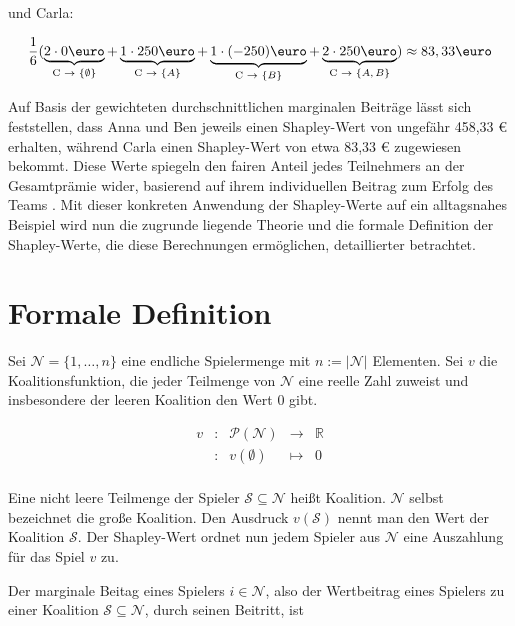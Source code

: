 und Carla:

\begin{equation}
  \frac{1}{6} ( \underbrace{2 \cdot 0 \text{\euro}}_{\text{C $\rightarrow$ $\{\emptyset$\}}} + \underbrace{1 \cdot 250 \text{\euro}}_{\text{C $\rightarrow$ $\{A$\}}} + \underbrace{1 \cdot (-250) \text{\euro}}_{\text{C $\rightarrow$ $\{B$\}}} + \underbrace{2 \cdot 250 \text{\euro}}_{\text{C $\rightarrow$ $\{A, B$\}}} ) \approx 83,33 \text{\euro}  
  \label{eq:marginal_carla}
\end{equation}

Auf Basis der gewichteten durchschnittlichen marginalen Beiträge lässt sich feststellen, 
dass Anna und Ben jeweils einen Shapley-Wert von ungefähr 458,33 \euro{} erhalten, 
während Carla einen Shapley-Wert von etwa 83,33 \euro{} zugewiesen bekommt. 
Diese Werte spiegeln den fairen Anteil jedes Teilnehmers an der Gesamtprämie wider, 
basierend auf ihrem individuellen Beitrag zum Erfolg des Teams \cite[S. 20]{Molnar_2023}. Mit dieser konkreten Anwendung der Shapley-Werte 
auf ein alltagsnahes Beispiel wird nun die zugrunde liegende Theorie und die formale Definition 
der Shapley-Werte, die diese Berechnungen ermöglichen, detaillierter betrachtet.

\section{Formale Definition}

Sei $\mathcal{N} = \{1, \ldots, n\}$ eine endliche Spielermenge mit $n := |\mathcal{N}|$ Elementen. Sei $v$ die Koalitionsfunktion, die jeder Teilmenge von $\mathcal{N}$ eine reelle Zahl zuweist und insbesondere der leeren Koalition den Wert $0$ gibt. 

\[
\begin{array}{rcccl}
  v &:  &\mathcal P(\mathcal{N}) &\longrightarrow &\mathbb{R}\\
  &: &v(\emptyset) &\mapsto &0\\
\end{array}
\]

Eine nicht leere Teilmenge der Spieler $\mathcal{S} \subseteq \mathcal{N}$ heißt Koalition. $\mathcal{N}$ selbst bezeichnet die große Koalition. Den Ausdruck $v(\mathcal{S})$ nennt man den Wert der Koalition $\mathcal{S}$.
Der Shapley-Wert ordnet nun jedem Spieler aus $\mathcal{N}$ eine Auszahlung für das Spiel $v$ zu.

Der marginale Beitag eines Spielers $i \in \mathcal{N}$, also der Wertbeitrag eines Spielers zu einer Koalition $\mathcal{S} \subseteq \mathcal{N}$, durch seinen Beitritt, ist

